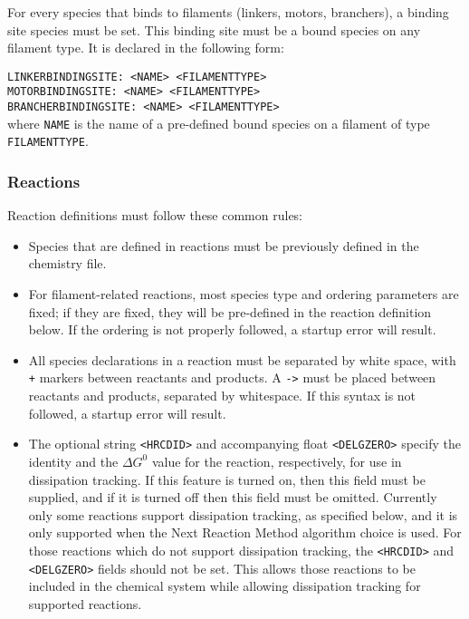 \documentclass[11pt, oneside]{article}   	%
\begin{document}
For every species that binds to filaments (linkers, motors, branchers), a binding site species must be set. This binding site must be a bound species on any filament type. It is declared in the following form: \newline

\noindent\texttt{LINKERBINDINGSITE: <NAME> <FILAMENTTYPE>}\\
\texttt{MOTORBINDINGSITE: <NAME> <FILAMENTTYPE>}\\
\texttt{BRANCHERBINDINGSITE: <NAME> <FILAMENTTYPE>}\\

\noindent where \texttt{NAME} is the name of a pre-defined bound species on a filament of type \texttt{FILAMENTTYPE}.

\subsubsection{Reactions}

Reaction definitions must follow these common rules:
\begin{itemize}
\item Species that are defined in reactions must be previously defined in the chemistry file. 
\item For filament-related reactions, most species type and ordering parameters are fixed; if they are fixed, they will be pre-defined in the reaction definition below. If the ordering is not properly followed, a startup error will result. 
\item All species declarations in a reaction must be separated by white space, with \texttt{+} markers between reactants and products. A \texttt{->} must be placed between reactants and products, separated by whitespace. If this syntax is not followed, a startup error will result.
\item The optional string \texttt{<HRCDID>} and accompanying float \texttt{<DELGZERO>} specify the identity and the $\Delta G^0$ value for the reaction, respectively, for use in dissipation tracking.  If this feature is turned on, then this field must be supplied, and if it is turned off then this field must be omitted.  Currently only some reactions support dissipation tracking, as specified below, and it is only supported when the Next Reaction Method algorithm choice is used.  For those reactions which do not support dissipation tracking, the \texttt{<HRCDID>} and \texttt{<DELGZERO>} fields should not be set.  This allows those reactions to be included in the chemical system while allowing dissipation tracking for supported reactions. 
\end{itemize}
\end{document}
